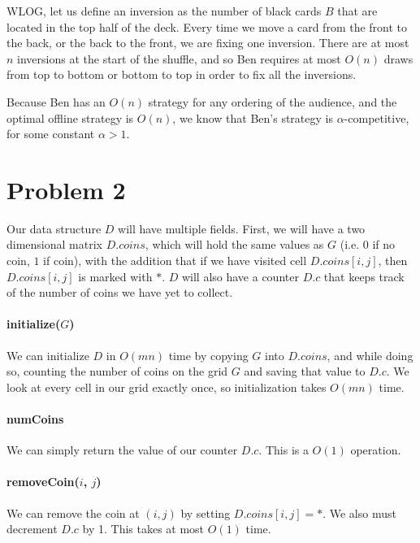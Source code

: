 \documentclass{6046}
\begin{document}
WLOG, let us define an inversion as the number of black cards $B$
that are located in the top half of the deck. Every time we move
a card from the front to the back, or the back to the front, we
are fixing one inversion. There are at most $n$ inversions at
the start of the shuffle, and so Ben requires at most $O(n)$
draws from top to bottom or bottom to top in order to fix all
the inversions.

Because Ben has an $O(n)$ strategy for any ordering of the audience,
and the optimal offline strategy is $O(n)$, we know that 
Ben's strategy is $\alpha$-competitive, for some constant $\alpha > 1$.

\section*{Problem 2}
Our data structure $D$ will have multiple fields. First,
we will have a two dimensional matrix $D.coins$, which will
hold the same values as $G$ (i.e. $0$ if no coin, $1$ if coin),
with the addition that if we have visited cell $D.coins[i, j]$,
then $D.coins[i, j]$ is marked with $*$.
$D$ will also have a counter $D.c$ that keeps track
of the number of coins we have yet to collect.

\paragraph{initialize($G$)} We can initialize $D$ in
$O(mn)$ time by copying $G$ into $D.coins$, and while doing so,
counting the number of coins on the grid $G$ and saving that
value to $D.c$. We look at every cell in our grid exactly once,
so initialization takes $O(mn)$ time.

\paragraph{numCoins} We can simply return the value of
our counter $D.c$. This is a $O(1)$ operation.

\paragraph{removeCoin($i$, $j$)} We can remove the
coin at $(i, j)$ by setting $D.coins[i, j] = *$. We also
must decrement $D.c$ by 1. This takes at most $O(1)$ time.
\end{document}

